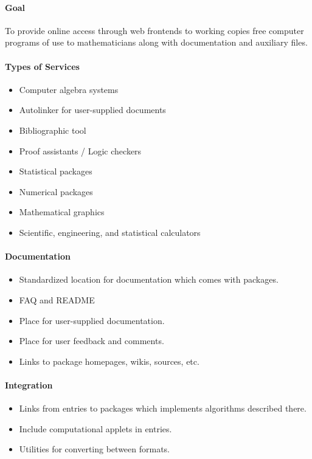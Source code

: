 \begin{itemize}
\paragraph{Goal} To provide online access through web frontends to working copies
free computer programs of use to mathematicians along with documentation
and auxiliary files.

\paragraph{Types of Services}

\begin{itemize}
\item
  Computer algebra systems
\item
  Autolinker for user-supplied documents
\item
  Bibliographic tool
\item
  Proof assistants / Logic checkers
\item
  Statistical packages
\item
  Numerical packages
\item
  Mathematical graphics
\item
  Scientific, engineering, and statistical calculators
\end{itemize}

\paragraph{Documentation}

\begin{itemize}
\item
  Standardized location for documentation which comes with packages.
\item
  FAQ and README
\item
  Place for user-supplied documentation.
\item
  Place for user feedback and comments.
\item
  Links to package homepages, wikis, sources, etc.
\end{itemize}

\paragraph{Integration}

\begin{itemize}
\item
  Links from entries to packages which implements algorithms described
  there.
\item
  Include computational applets in entries.
\item
  Utilities for converting between formats.
\end{itemize}


\end{itemize}
